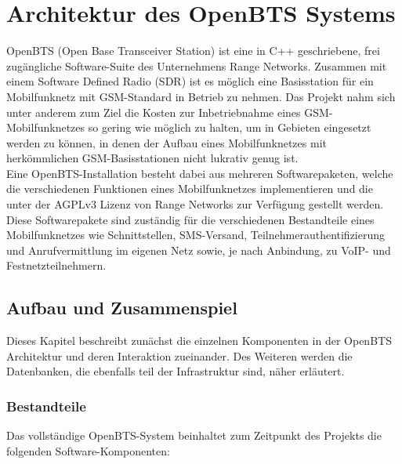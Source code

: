 \section{Architektur des OpenBTS Systems}
OpenBTS (Open Base Transceiver Station) ist eine in C++ geschriebene, frei zugängliche Software-Suite des Unternehmens Range Networks. Zusammen mit einem Software Defined Radio (SDR) ist es möglich eine Basisstation für ein Mobilfunknetz mit GSM-Standard in Betrieb zu nehmen.
Das Projekt nahm sich unter anderem zum Ziel die Kosten zur Inbetriebnahme eines GSM-Mobilfunknetzes so gering wie möglich zu halten, um in Gebieten eingesetzt werden zu können, in denen der Aufbau eines Mobilfunknetzes mit herkömmlichen GSM-Basisstationen nicht lukrativ genug ist.\\
Eine OpenBTS-Installation besteht dabei aus mehreren Softwarepaketen, welche die verschiedenen Funktionen eines Mobilfunknetzes implementieren und die unter der AGPLv3 Lizenz von Range Networks zur Verfügung gestellt werden. Diese Softwarepakete sind zuständig für die verschiedenen Bestandteile eines Mobilfunknetzes wie Schnittstellen, SMS-Versand, Teilnehmerauthentifizierung und Anrufvermittlung im eigenen Netz sowie, je nach Anbindung, zu VoIP- und Festnetzteilnehmern.


\subsection{Aufbau und Zusammenspiel}
Dieses Kapitel beschreibt zunächst die einzelnen Komponenten in der OpenBTS Architektur und deren Interaktion zueinander. Des Weiteren werden die Datenbanken, die ebenfalls teil der Infrastruktur sind, näher erläutert.

\subsubsection{Bestandteile}

Das vollständige OpenBTS-System beinhaltet zum Zeitpunkt des Projekts die folgenden Software-Komponenten:

